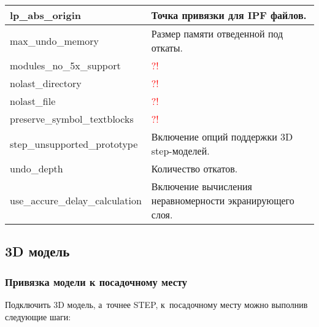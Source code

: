\begin{tabularx}{\linewidth}{| m{6.5cm} | X |}
	lp\_abs\_origin			& Точка привязки для IPF файлов.		\\ \hline 
	max\_undo\_memory 		& Размер памяти отведенной под откаты.	\\ \hline
	modules\_no\_5x\_support& \textcolor{red}{?!}					\\ \hline
	nolast\_directory 		& \textcolor{red}{?!}					\\ \hline
	nolast\_file 			& \textcolor{red}{?!}					\\ \hline
	preserve\_symbol\_textblocks & \textcolor{red}{?!}				\\ \hline	
	step\_unsupported\_prototype & Включение опций поддержки 3D step-моделей. \\ \hline
	undo\_depth 			& Количество откатов.					\\ \hline
	use\_accure\_delay\_calculation & Включение вычисления неравномерности экранирующего слоя. \\ \hline
\end{tabularx}



\newpage
\subsection{3D модель} \label{ssec:3d_model}



\subsubsection{Привязка модели к посадочному месту} \label{sssec:step_package_mapping}

Подключить 3D модель, а~точнее STEP, к~посадочному месту можно выполнив следующие шаги:

